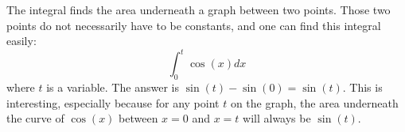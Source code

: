 \documentclass[../revisedmain.tex]{subfiles}
\begin{document}
The integral finds the area underneath a graph between two points. Those two points do not necessarily have to be constants, and one can find this integral easily: $$\int_{0}^{t}\cos(x)dx$$ where $t$ is a variable. The answer is	$\sin(t)-\sin(0)=\sin(t)$. This is interesting, especially because for any point $t$ on the graph, the area underneath the curve of $\cos(x)$ between $x=0$ and $x=t$ will always be $\sin(t)$.
\end{document}
